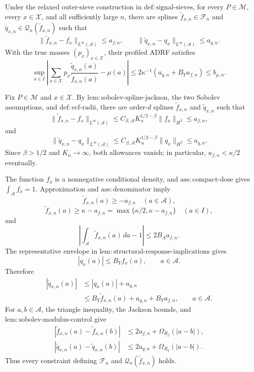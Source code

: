 Under the relaxed outer-sieve construction in \(\mathrm{def{:}signal\text{-}sieves}\), for every \(P\in\mathcal M\), every \(x\in\mathcal X\), and all sufficiently large \(n\), there are splines \(\widetilde f_{x,n}\in\mathscr F_n\) and \(\widetilde q_{x,n}\in\mathscr Q_n(\widetilde f_{x,n})\) such that
\[
 \|\widetilde f_{x,n}-f_x\|_{L^\infty(\mathcal A)}\le a_{f,n},
 \qquad
 \|\widetilde q_{x,n}-q_x\|_{L^\infty(\mathcal A)}\le a_{q,n}.
\]
With the true masses \((p_x)_{x\in\mathcal X}\), their profiled ADRF satisfies
\[
 \sup_{a\in I}\left|
 \sum_{x\in\mathcal X}p_x\frac{\widetilde q_{x,n}(a)}{\widetilde f_{x,n}(a)}-\mu(a)
 \right|
 \le 2\kappa^{-1}(a_{q,n}+B_Ya_{f,n})
 \le b_{\mu,n}.
\]

Fix \(P\in\mathcal M\) and \(x\in\mathcal X\).  By \(\mathrm{lem{:}sobolev\text{-}spline\text{-}jackson}\), the two Sobolev assumptions, and \(\mathrm{def{:}ecf\text{-}radii}\), there are order-\(d\) splines \(\widetilde f_{x,n}\) and \(\widetilde q_{x,n}\) such that
\[
 \|\widetilde f_{x,n}-f_x\|_{L^\infty(\mathcal A)}
 \le C_{\beta,\mathcal A}K_n^{1/2-\beta}\|f_x\|_{H^\beta}
 \le a_{f,n},
\]
and
\[
 \|\widetilde q_{x,n}-q_x\|_{L^\infty(\mathcal A)}
 \le C_{\beta,\mathcal A}K_n^{1/2-\beta}\|q_x\|_{H^\beta}
 \le a_{q,n}.
\]
Since \(\beta>1/2\) and \(K_n\to\infty\), both allowances vanish; in particular, \(a_{f,n}<\kappa/2\) eventually.

The function \(f_x\) is a nonnegative conditional density, and \(\mathrm{ass{:}compact\text{-}dose}\) gives \(\int_{\mathcal A}f_x=1\).  Approximation and \(\mathrm{ass{:}denominator}\) imply
\[
 \widetilde f_{x,n}(a)\ge-a_{f,n}\quad(a\in\mathcal A),
\]
\[
 \widetilde f_{x,n}(a)\ge\kappa-a_{f,n}
 =\max\{\kappa/2,\kappa-a_{f,n}\}\quad(a\in I),
\]
and
\[
 \left|\int_{\mathcal A}\widetilde f_{x,n}(a)\,da-1\right|
 \le2B_Aa_{f,n}.
\]
The representative envelope in \(\mathrm{lem{:}structural\text{-}response\text{-}implications}\) gives
\[
 |q_x(a)|\le B_Yf_x(a),\qquad a\in\mathcal A.
\]
Therefore
\[
 \begin{aligned}
 |\widetilde q_{x,n}(a)|
 &\le |q_x(a)|+a_{q,n}\\
 &\le B_Y\widetilde f_{x,n}(a)+a_{q,n}+B_Ya_{f,n},
 \qquad a\in\mathcal A.
 \end{aligned}
\]
For \(a,b\in\mathcal A\), the triangle inequality, the Jackson bounds, and \(\mathrm{lem{:}sobolev\text{-}modulus\text{-}control}\) give
\[
 \begin{aligned}
 |\widetilde f_{x,n}(a)-\widetilde f_{x,n}(b)|
 &\le2a_{f,n}+\Omega_{R_f}(|a-b|),\\
 |\widetilde q_{x,n}(a)-\widetilde q_{x,n}(b)|
 &\le2a_{q,n}+\Omega_{R_q}(|a-b|).
 \end{aligned}
\]
Thus every constraint defining \(\mathscr F_n\) and \(\mathscr Q_n(\widetilde f_{x,n})\) holds.

